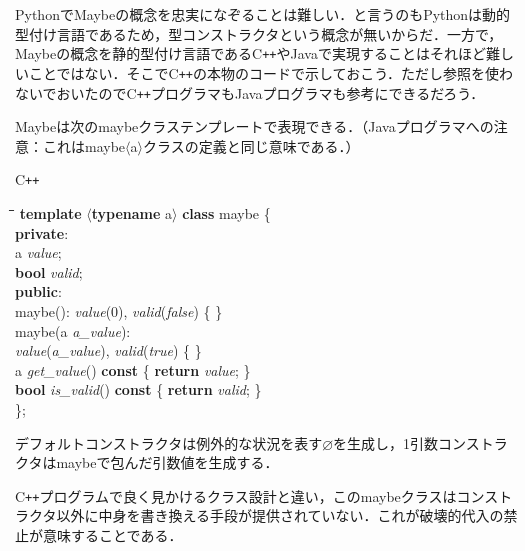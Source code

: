 \documentclass[twocolumn]{jsbook}
\newcommand{\cxx}{\textrm{C}\texttt{++}}
\newenvironment{cxxcode}{\begin{itembox}[r]{\cxx}}{\end{itembox}}
\newenvironment{python}{\begin{tabbing}\hspace*{1em}\=\hspace*{1em}\=\hspace*{1em}\=\hspace*{1em}\=\kill}{\end{tabbing}}
\newcommand{\pthnClassname}[1]{\textrm{#1}}
\newcommand{\pthnId}[1]{\textit{#1}}
\newcommand{\pthnKeyword}[1]{\textbf{#1}}
\newcommand{\hsklNothing}{\varnothing}
\begin{document}

PythonでMaybeの概念を忠実になぞることは難しい．と言うのもPythonは動的型付け言語であるため，型コンストラクタという概念が無いからだ．一方で，Maybeの概念を静的型付け言語である\cxx やJavaで実現することはそれほど難しいことではない．そこで\cxx の本物のコードで示しておこう．ただし参照を使わないでおいたので\cxx プログラマもJavaプログラマも参考にできるだろう．

Maybeは次の\pthnClassname{maybe}クラステンプレートで表現できる．（Javaプログラマへの注意：これは\pthnClassname{maybe}$\langle$\pthnClassname{a}$\rangle$クラスの定義と同じ意味である．）
\begin{cxxcode}
\begin{python}
\pthnKeyword{template} $\langle$\pthnKeyword{typename} \pthnClassname{a}$\rangle$ \pthnKeyword{class} \pthnClassname{maybe} \{\\
\pthnKeyword{private}:\\
\>\pthnClassname{a} \pthnId{value};\\
\>\pthnKeyword{bool} \pthnId{valid};\\
\pthnKeyword{public}:\\
\>\pthnClassname{maybe}(): \pthnId{value}($0$), \pthnId{valid}(\pthnId{false}) \{ \}\\
\>\pthnClassname{maybe}(\pthnClassname{a} \pthnId{a\_value}):\\
\>\>\pthnId{value}(\pthnId{a\_value}), \pthnId{valid}(\pthnId{true}) \{ \}\\
\>\pthnClassname{a} \pthnId{get\_value}() \pthnKeyword{const} \{ \pthnKeyword{return} \pthnId{value}; \}\\
\>\pthnKeyword{bool} \pthnId{is\_valid}() \pthnKeyword{const} \{ \pthnKeyword{return} \pthnId{valid}; \}\\
\};
\end{python}
\end{cxxcode}
デフォルトコンストラクタは例外的な状況を表す$\hsklNothing$を生成し，1引数コンストラクタは\pthnClassname{maybe}で包んだ引数値を生成する．

\cxx プログラムで良く見かけるクラス設計と違い，この\pthnClassname{maybe}クラスはコンストラクタ以外に中身を書き換える手段が提供されていない．これが破壊的代入の禁止が意味することである．
\end{document}
